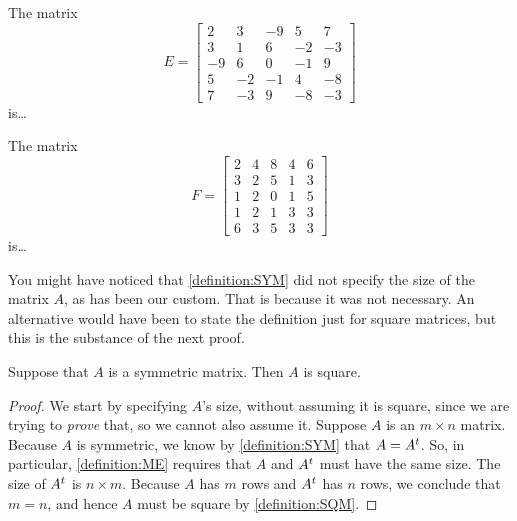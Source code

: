 \documentclass{ximera}
\begin{document}
\begin{example}

  The matrix
  \[
    E=
    \begin{bmatrix}
      2&3&-9&5&7\\
      3&1&6&-2&-3\\
      -9&6&0&-1&9\\
      5&-2&-1&4&-8\\
      7&-3&9&-8&-3
    \end{bmatrix}
  \]
  is\ldots
  \begin{multipleChoice}
  \end{multipleChoice}
\end{example}

\begin{example}

  The matrix
  \[
    F=
    \begin{bmatrix}
      2&4&8&4&6\\
      3&2&5&1&3\\
      1&2&0&1&5\\
      1&2&1&3&3\\
      6&3&5&3&3
    \end{bmatrix}
  \]
  is\ldots
  \begin{multipleChoice}
  \end{multipleChoice}
\end{example}

You might have noticed that \ref{definition:SYM} did not specify the
size of the matrix $A$, as has been our custom.  That is because it
was not necessary.  An alternative would have been to state the
definition just for square matrices, but this is the substance of the
next proof.

\begin{theorem}
  \label{theorem:SMS}
  Suppose that $A$ is a symmetric matrix.  Then $A$ is square.
  
  \begin{proof}
    We start by specifying $A$'s size, without assuming it is square,
    since we are trying to \textit{prove} that, so we cannot also
    assume it.  Suppose $A$ is an $m\times n$ matrix.  Because $A$ is
    symmetric, we know by \ref{definition:SYM} that $A=A^{t}$.
    So, in particular, \ref{definition:ME} requires that $A$ and
    $A^{t}$ must have the same size.  The size of
    $A^{t}$ is $n\times m$.  Because $A$ has $m$ rows and
    $A^{t}$ has $n$ rows, we conclude that $m=n$, and hence
    $A$ must be square by \ref{definition:SQM}.
  \end{proof}
\end{theorem}
\end{document}
